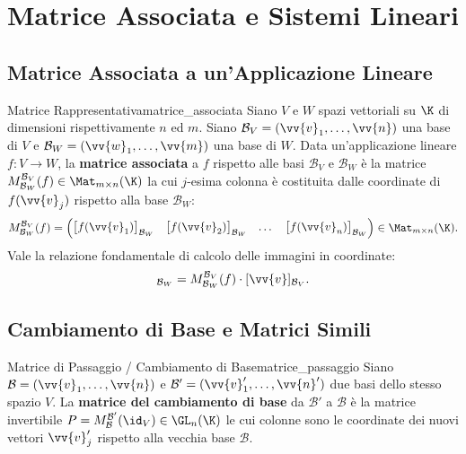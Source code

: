 
\chapter{Matrice Associata e Sistemi Lineari}
\label{chap:matrici_sistemi}

\section{Matrice Associata a un'Applicazione Lineare}

\begin{definizione}{Matrice Rappresentativa}{matrice_associata}
Siano $V$ e $W$ spazi vettoriali su $\K$ di dimensioni rispettivamente $n$ ed $m$. Siano $\mathcal{B}_V = (\vv{v}_1, \dots, \vv{n})$ una base di $V$ e $\mathcal{B}_W = (\vv{w}_1, \dots, \vv{m})$ una base di $W$.
Data un'applicazione lineare $f: V \to W$, la \textbf{matrice associata} a $f$ rispetto alle basi $\mathcal{B}_V$ e $\mathcal{B}_W$ è la matrice $M_{\mathcal{B}_W}^{\mathcal{B}_V}(f) \in \Mat_{m \times n}(\K)$ la cui $j$-esima colonna è costituita dalle coordinate di $f(\vv{v}_j)$ rispetto alla base $\mathcal{B}_W$:
\begin{equation}
    M_{\mathcal{B}_W}^{\mathcal{B}_V}(f) = \begin{pmatrix}
        \big[f(\vv{v}_1)\big]_{\mathcal{B}_W} & \big[f(\vv{v}_2)\big]_{\mathcal{B}_W} & \dots & \big[f(\vv{v}_n)\big]_{\mathcal{B}_W}
    \end{pmatrix} \in \Mat_{m \times n}(\K).
\end{equation}
Vale la relazione fondamentale di calcolo delle immagini in coordinate:
\begin{equation}
    [f(\vv{v})]_{\mathcal{B}_W} = M_{\mathcal{B}_W}^{\mathcal{B}_V}(f) \cdot [\vv{v}]_{\mathcal{B}_V}.
\end{equation}
\end{definizione}

\section{Cambiamento di Base e Matrici Simili}

\begin{definizione}{Matrice di Passaggio / Cambiamento di Base}{matrice_passaggio}
Siano $\mathcal{B} = (\vv{v}_1, \dots, \vv{n})$ e $\mathcal{B}' = (\vv{v}'_1, \dots, \vv{n}')$ due basi dello stesso spazio $V$. La \textbf{matrice del cambiamento di base} da $\mathcal{B}'$ a $\mathcal{B}$ è la matrice invertibile $P = M_{\mathcal{B}}^{\mathcal{B}'}(\id_V) \in \GL_n(\K)$ le cui colonne sono le coordinate dei nuovi vettori $\vv{v}'_j$ rispetto alla vecchia base $\mathcal{B}$.
\end{definizione}

